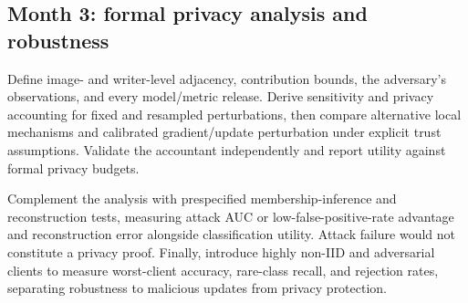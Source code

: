 \subsection{Month 3: formal privacy analysis and robustness}
Define image- and writer-level adjacency, contribution bounds, the adversary's observations, and every model/metric release. Derive sensitivity and privacy accounting for fixed and resampled perturbations, then compare alternative local mechanisms and calibrated gradient/update perturbation under explicit trust assumptions. Validate the accountant independently and report utility against formal privacy budgets.

Complement the analysis with prespecified membership-inference and reconstruction tests, measuring attack AUC or low-false-positive-rate advantage and reconstruction error alongside classification utility. Attack failure would not constitute a privacy proof. Finally, introduce highly non-IID and adversarial clients to measure worst-client accuracy, rare-class recall, and rejection rates, separating robustness to malicious updates from privacy protection.
